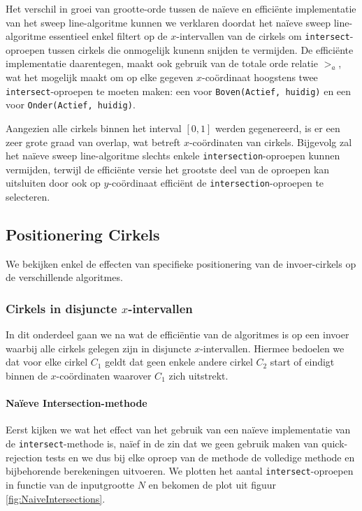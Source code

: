 \documentclass[12pt]{article}
\begin{document}
Het verschil in groei van grootte-orde tussen de naïeve en efficiënte implementatie van het sweep line-algoritme kunnen we verklaren doordat het naïeve sweep line-algoritme essentieel enkel filtert op de $x$-intervallen van de cirkels om \texttt{intersect}-oproepen tussen cirkels die onmogelijk kunenn snijden te vermijden. De efficiënte implementatie daarentegen, maakt ook gebruik van de totale orde relatie $>_a$, wat het mogelijk maakt om op elke gegeven $x$-coördinaat hoogstens twee \texttt{intersect}-oproepen te moeten maken: een voor \texttt{Boven(Actief, huidig)} en een voor \texttt{Onder(Actief, huidig)}.

Aangezien alle cirkels binnen het interval $[0,1]$ werden gegenereerd, is er een zeer grote graad van overlap, wat betreft $x$-coördinaten van cirkels. Bijgevolg zal het naïeve sweep line-algoritme slechts enkele \texttt{intersection}-oproepen kunnen vermijden, terwijl de efficiënte versie het grootste deel van de oproepen kan uitsluiten door ook op $y$-coördinaat efficiënt de \texttt{intersection}-oproepen te selecteren.

\subsection{Positionering Cirkels}
We bekijken enkel de effecten van specifieke positionering van de invoer-cirkels op de verschillende algoritmes.

\subsubsection{Cirkels in disjuncte $x$-intervallen}
In dit onderdeel gaan we na wat de efficiëntie van de algoritmes is op een invoer waarbij alle cirkels gelegen zijn in disjuncte $x$-intervallen. Hiermee bedoelen we dat voor elke cirkel $C_1$ geldt dat geen enkele andere cirkel $C_2$ start of eindigt binnen de $x$-coördinaten waarover $C_1$ zich uitstrekt.

\paragraph{Naïeve Intersection-methode}
Eerst kijken we wat het effect van het gebruik van een naïeve implementatie van de \texttt{intersect}-methode is, naïef in de zin dat we geen gebruik maken van quick-rejection tests en we dus bij elke oproep van de methode de volledige methode en bijbehorende berekeningen uitvoeren. We plotten het aantal \texttt{intersect}-oproepen in functie van de inputgrootte $N$ en bekomen de plot uit figuur \ref{fig:NaiveIntersections}.
\end{document}
